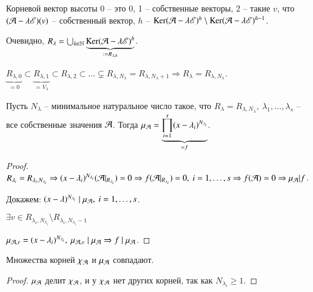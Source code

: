\documentclass[main]{subfiles}
\begin{document}
Корневой вектор высоты 0 -- это 0, 1 -- собственные векторы, 2 -- такие $v$, что $(\mathcal{A} - \lambda \mathscr{E})(v)$ -- собственный вектор,
$h$ -- $\operatorname{Ker}(\mathcal{A} - \lambda \mathscr{E})^h \setminus \operatorname{Ker}(\mathcal{A} - \lambda \mathscr{E})^{h-1}$.

Очевидно, $R_{\lambda} = \bigcup_{h \in \mathbb{N}} \underbrace{\operatorname{Ker}(\mathcal{A} - \lambda \mathscr{E})^h}_{:= R_{\lambda, h}}$.

$\underbrace{R_{\lambda, 0}}_{=0} \subset \underbrace{R_{\lambda, 1}}_{= V_{\lambda}} \subset R_{\lambda, 2} \subset \ldots \subsetneq  R_{\lambda, N_{\lambda}} = R_{\lambda, N_{\lambda} + 1} \Rightarrow
  R_{\lambda} = R_{\lambda, N_{\lambda}}$.

\begin{proposition}
  Пусть $N_{\lambda}$ -- минимальное натуральное число такое, что $R_{\lambda} = R_{\lambda, N_{\lambda}}, \ \lambda_1, \ldots, \lambda_s$ -- все собственные значения $\mathcal{A}$.
  Тогда ${\mu}_{\mathcal{A}} = \underbrace{\prod_{i = 1}^s(x-\lambda_i)^{N_{\lambda_i}}}_{=f}$.
\end{proposition}

\begin{proof}
  $R_{\lambda_i} = R_{\lambda_i, N_{\lambda_i}} \Rightarrow (x - \lambda_i)^{N_{\lambda_i}}(\mathcal{A}|_{R_{\lambda_i}}) = 0 \Rightarrow
    f(\mathcal{A}|_{R_{\lambda_i}}) = 0, \ i = 1, \ldots, s \Rightarrow f(\mathcal{A}) = 0 \Rightarrow \mu_{\mathcal{A}} | f$.

  Докажем: $(x - \lambda)^{N_{\lambda_i}} \mid \mu_{\mathcal{A}}, \ i = 1, \ldots, s$.

  $\exists v \in R_{\lambda_i, N_{\lambda_i}}\setminus R_{\lambda_i, N_{\lambda_i} - 1}$

  $\mu_{\mathcal{A}, v} = (x - \lambda_i)^{N_{\lambda_i}}, \ \mu_{\mathcal{A}, v} \mid \mu_{\mathcal{A}} \Rightarrow f \mid \mu_{\mathcal{A}}$.
\end{proof}

\begin{corollary}
  Множества корней $\chi_{\mathcal{A}}$ и $\mu_{\mathcal{A}}$ совпадают.
\end{corollary}

\begin{proof}
  $\mu_{\mathcal{A}}$ делит $\chi_{\mathcal{A}}$, и у $\chi_{\mathcal{A}}$ нет других корней, так как $N_{\lambda_i} \geq  1$.
\end{proof}
\end{document}
